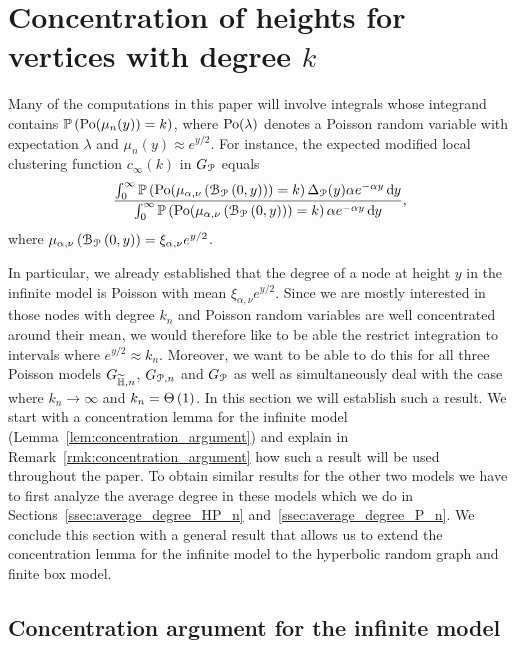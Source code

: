 \section{Concentration of heights for vertices with degree $k$}\label{sec:concentration_argument}

Many of the computations in this paper will involve integrals whose integrand contains $\mathbb{P}\left({\mathrm{Po}}(\mu_n(y)) = k\right)$, where ${\mathrm{Po}}(\lambda)$ denotes a Poisson random variable with expectation $\lambda$ and $\mu_n(y) \approx e^{y/2}$. For instance, the expected modified local clustering function $c_\infty(k)$ in $G_{{\mathcal P}}$ equals
\[
	\frac{\int_0^\infty \mathbb{P}\left({\mathrm{Po}}(\mu_{\alpha,\nu}\left({\mathcal B}_{{\mathcal P}}\left(0,y\right)\right)) = k\right) \Delta_{{\mathcal P}}(y) \alpha e^{-\alpha y} \operatorname{\mathrm{d}\hspace{-2pt}} y}
	{\int_0^\infty \mathbb{P}\left({\mathrm{Po}}(\mu_{\alpha,\nu}\left({\mathcal B}_{{\mathcal P}}\left(0,y\right)\right)) = k\right) \alpha e^{-\alpha y} \operatorname{\mathrm{d}\hspace{-2pt}} y},
\]
where $\mu_{\alpha,\nu}\left({\mathcal B}_{{\mathcal P}}\left(0,y\right)\right) = \xi_{\alpha,\nu} e^{y/2}$. 

In particular, we already established that the degree of a node at height $y$ in the infinite model is Poisson with mean $\xi_{\alpha,\nu} e^{y/2}$. Since we are mostly interested in those nodes with degree $k_n$ and Poisson random variables are well concentrated around their mean, we would therefore like to be able the restrict integration to intervals where $e^{y/2} \approx k_n$. Moreover, we want to be able to do this for all three Poisson models $G_{\widetilde{\mathbb{H}},n}$, $G_{{\mathcal P},n}$ and $G_{{\mathcal P}}$ as well as simultaneously deal with the case where $k_n \to \infty$ and $k_n = \Theta\left(1\right)$. In this section we will establish such a result. We start with a concentration lemma for the infinite model (Lemma~\ref{lem:concentration_argument}) and explain in Remark~\ref{rmk:concentration_argument} how such a result will be used throughout the paper. To obtain similar results for the other two models we have to first analyze the average degree in these models which we do in Sections~\ref{ssec:average_degree_HP_n} and~\ref{ssec:average_degree_P_n}. We conclude this section with a general result that allows us to extend the concentration lemma for the infinite model to the hyperbolic random graph and finite box model. 

\subsection{Concentration  argument for the infinite model}

